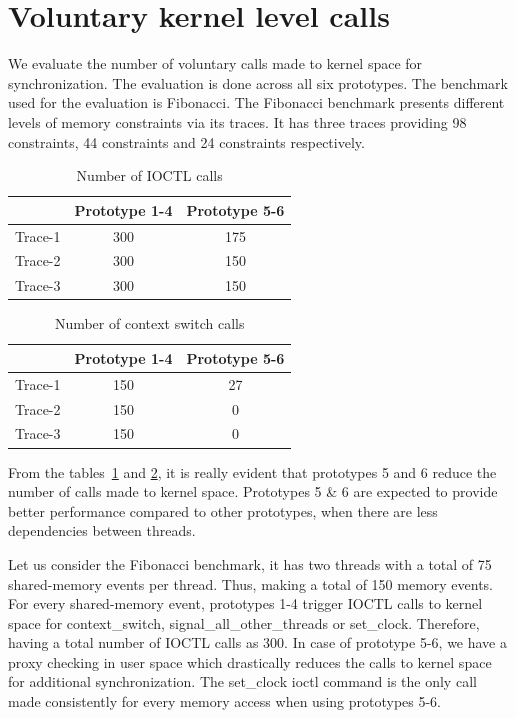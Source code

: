 \section{Voluntary kernel level calls \label{vol_kernel_calls}}

We evaluate the number of voluntary calls made to kernel space for synchronization. 
The evaluation is done across all six prototypes. 
The benchmark used for the evaluation is Fibonacci. 
The Fibonacci benchmark presents different levels of memory constraints via its traces. 
It has three traces providing 98 constraints, 44 constraints and 24 constraints respectively.

\begin{table}[h]
\begin{center}
 \begin{tabular}{|c c c|} 
 \hline
 & Prototype 1-4 & Prototype 5-6\\ %
 \hline
 Trace-1 & 300 & 175\\ 
 Trace-2 & 300 & 150\\
 Trace-3 & 300 & 150\\
 \hline
\end{tabular}
\end{center}
\caption{Number of IOCTL calls}
\label{num_ioctls}
\end{table}
\begin{table}
\begin{center}
 \begin{tabular}{|c c c|} 
 \hline
 & Prototype 1-4 & Prototype 5-6\\ %
 \hline
 Trace-1 & 150 & 27\\ 
 Trace-2 & 150 & 0\\
 Trace-3 & 150 & 0\\
 \hline
\end{tabular}
\end{center}
\caption{Number of context switch calls}
\label{num_ctxts}
\end{table}

From the tables~\ref{num_ioctls} and \ref{num_ctxts}, it is really evident that prototypes 5 and 6 reduce the number of calls made to kernel space. 
Prototypes 5 \& 6 are expected to provide better performance compared to other prototypes, when there are less dependencies between threads. 

Let us consider the Fibonacci benchmark, it has two threads with a total of 75 shared-memory events per thread. 
Thus, making a total of 150 memory events. 
For every shared-memory event, prototypes 1-4 trigger IOCTL calls to kernel space for context\_switch, signal\_all\_other\_threads or set\_clock. 
Therefore, having a total number of IOCTL calls as 300. 
In case of prototype 5-6, we have a proxy checking in user space which drastically reduces the calls to kernel space for additional synchronization. 
The set\_clock ioctl command is the only call made consistently for every memory access when using prototypes 5-6.

